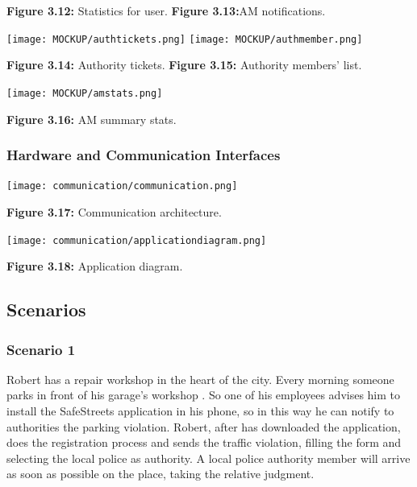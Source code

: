 \documentclass[12pt]{article}
\begin{document}
		 \textbf{Figure 3.12:} Statistics for user.  \hfill \textbf{Figure 3.13:}AM notifications.


\newpage
 
\texttt{[image: MOCKUP/authtickets.png]}                  \hfill \texttt{[image: MOCKUP/authmember.png]}
		 
		 \textbf{Figure 3.14:} Authority tickets.   \hfill \textbf{Figure 3.15:} Authority members' list.
		\begin{center}
  \texttt{[image: MOCKUP/amstats.png]}                  
  
		 \textbf{Figure 3.16:} AM summary stats.
	\end{center}



\subsubsection{Hardware and Communication Interfaces}
\vspace{5mm}
\begin{center}
\texttt{[image: communication/communication.png]}                 

\textbf{Figure 3.17:} Communication architecture. 
\end{center}

\begin{center}
\texttt{[image: communication/applicationdiagram.png]}                 

\textbf{Figure 3.18:} Application diagram. 
\end{center}

\newpage

\subsection{Scenarios}
\subsubsection{Scenario 1}
\vspace{2mm}
Robert has a repair workshop in the heart of the city. Every morning someone parks in front of his garage’s workshop . So one of his employees advises him to install the SafeStreets application in his phone, so in this way he can notify to authorities the parking violation. Robert, after has downloaded the application, does the registration process and sends the traffic violation, filling the form and selecting the local police as authority. A local police authority member will arrive as soon as possible on the place, taking the relative judgment.
\end{document}
